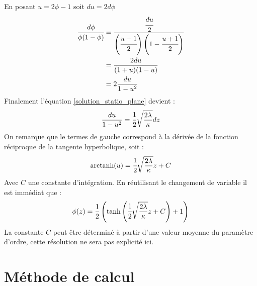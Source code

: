 En posant $u = 2\phi - 1$ soit $du = 2d\phi$
\begin{align*}
	 \cfrac{d\phi}{\phi(1-\phi)} &= \cfrac{\cfrac{du}{2}}{\left(\cfrac{u+1}{2}\right)\left( 1 -\cfrac{u+1}{2}\right)} \\
	 & = \frac{2du}{(1+u)(1-u)} \\
	 & = 2\frac{du}{1-u^2}
\end{align*}
Finalement l'équation \ref{solution_statio_plane} devient :
\begin{equation}
	\frac{du}{1-u^2} = \cfrac{1}{2}\sqrt{\frac{2\lambda}{\kappa}}dz
\end{equation}
On remarque que le termes de gauche correspond à la dérivée de la fonction réciproque de la tangente hyperbolique, soit :
\begin{equation}
	\text{arctanh}(u) = \cfrac{1}{2}\sqrt{\frac{2\lambda}{\kappa}} z + C
\end{equation}
Avec $C$ une constante d'intégration.
En réutilisant le changement de variable il est immédiat que :
 \begin{equation}
 \phi(z) = \frac{1}{2}\left(\tanh \left(\cfrac{1}{2}\sqrt{\frac{2\lambda}{\kappa}}z +C\right)+1\right)
 \end{equation}
La constante $C$ peut être déterminé à partir d'une valeur moyenne du paramètre d'ordre, cette résolution ne sera pas explicité ici.

\section{Méthode de calcul}




